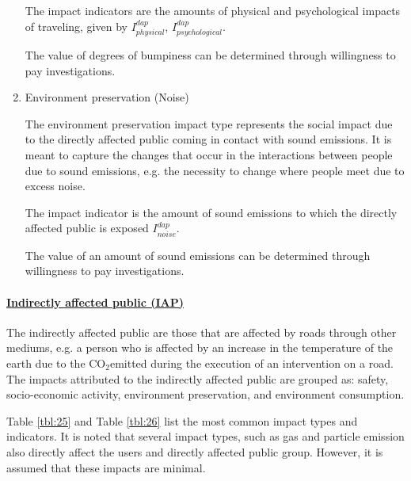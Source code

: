 \begin{enumerate}
The impact indicators are the amounts of physical and psychological impacts of traveling, given by $I_{physical}^{dap}$, $I_{psychological}^{dap}$. 

The value of degrees of bumpiness can be determined through willingness to pay investigations.

\item Environment preservation (Noise)

The environment preservation impact type represents the social impact due to the directly affected public coming in contact with sound emissions. It is meant to capture the changes that occur in the interactions between people due to sound emissions, e.g. the necessity to change where people meet due to excess noise.  

The impact indicator is the amount of sound emissions to which the directly affected public is exposed $I_{noise}^{dap}$.

The value of an amount of sound emissions can be determined through willingness to pay investigations.
\end{enumerate}
%
\paragraph{\underline{Indirectly affected public (IAP)}} \label{2iap}
%
The indirectly affected public are those that are affected by roads through other mediums, e.g. a person who is affected by an increase in the temperature of the earth due to the CO$_{2 }$emitted during the execution of an intervention on a road. The impacts attributed to the indirectly affected public are grouped as: safety, socio-economic activity, environment preservation, and environment consumption.  

Table \ref{tbl:25} and Table \ref{tbl:26} list the most common impact types and indicators. It is noted that several impact types, such as gas and particle emission also directly affect the users and directly affected public group. However, it is assumed that these impacts are minimal.

